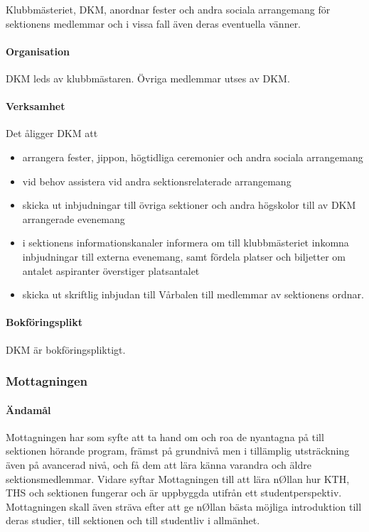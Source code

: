 \documentclass[a4paper,12pt]{article}
\begin{document}
Klubbmästeriet, DKM, anordnar fester och andra sociala arrangemang för sektionens medlemmar och i vissa fall även deras eventuella vänner.

\paragraph{Organisation}

DKM leds av klubbmästaren. Övriga medlemmar utses av DKM.

\paragraph{Verksamhet}

Det åligger DKM att

\begin{itemize}
  \item arrangera fester, jippon, högtidliga ceremonier och andra sociala arrangemang
  \item vid behov assistera vid andra sektionsrelaterade arrangemang
  \item skicka ut inbjudningar till övriga sektioner och andra högskolor till av DKM arrangerade evenemang
  \item i sektionens informationskanaler informera om till klubbmästeriet inkomna inbjudningar till externa evenemang, samt fördela platser och biljetter om antalet aspiranter överstiger platsantalet
  \item skicka ut skriftlig inbjudan till Vårbalen till medlemmar av sektionens ordnar.
\end{itemize}

\paragraph{Bokföringsplikt}

DKM är bokföringspliktigt.

\subsubsection{Mottagningen}

\paragraph{Ändamål}

Mottagningen har som syfte att ta hand om och roa de nyantagna på till sektionen hörande program, främst på grundnivå men i tillämplig utsträckning även på avancerad nivå, och få dem att lära känna varandra och äldre sektionsmedlemmar. Vidare syftar Mottagningen till att lära nØllan hur KTH, THS och sektionen fungerar och är uppbyggda utifrån ett studentperspektiv. Mottagningen skall även sträva efter att ge nØllan bästa möjliga introduktion till deras studier, till sektionen och till studentliv i allmänhet.
\end{document}
